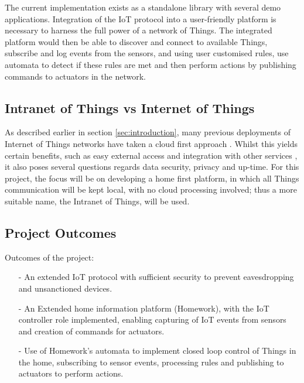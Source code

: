 \documentclass{mprop}
\begin{document}
The current implementation exists as a standalone library with several demo applications. Integration of the IoT protocol into a user-friendly platform is necessary to harness the full power of a network of Things. The integrated platform would then be able to discover and connect to available Things, subscribe and log events from the sensors, and using user customised rules, use automata to detect if these rules are met and then perform actions by publishing commands to actuators in the network.

\subsection{Intranet of Things vs Internet of Things} %
\label{sub:intranet_of_things}

As described earlier in section \ref{sec:introduction}, many previous deployments of Internet of Things networks have taken a cloud first approach \cite{SmartThings, Twine}. Whilst this yields certain benefits, such as easy external access and integration with other services \cite{IFTTT, Xively}, it also poses several questions regards data security, privacy and up-time. For this project, the focus will be on developing a home first platform, in which all Things communication will be kept local, with no cloud processing involved; thus a more suitable name, the Intranet of Things, will be used. 

\subsection{Project Outcomes} %
\label{sub:project_outcomes}

Outcomes of the project:
\begin{itemize}
  \item[-] An extended IoT protocol with sufficient security to prevent eavesdropping and unsanctioned devices.
  \item[-] An Extended home information platform (Homework), with the IoT controller role implemented, enabling capturing of IoT events from sensors and creation of commands for actuators.
  \item[-] Use of Homework's automata to implement closed loop control of Things in the home, subscribing to sensor events, processing rules and publishing to actuators to perform actions.
\end{itemize}
\end{document}
